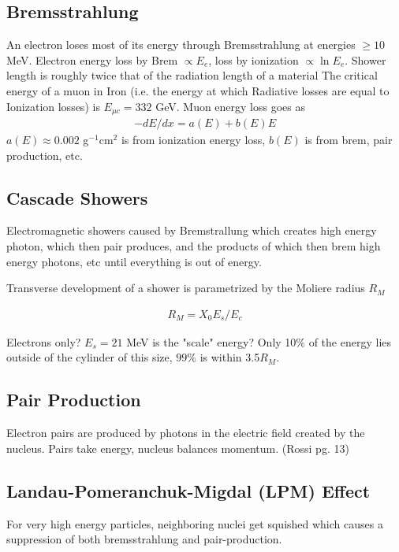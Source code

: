 \subsection{Bremsstrahlung}
 An electron loses most of its energy through Bremsstrahlung at energies $\ge 10$ MeV. Electron energy loss by Brem $\propto E_e$, loss by ionization $\propto \ln E_e$. Shower length is roughly twice that of the radiation length of a material \cite{pdg} The critical energy of a muon in Iron (i.e. the energy at which Radiative losses are equal to Ionization losses) is $E_{\mu c} = 332$ GeV. Muon energy loss goes as 
 \begin{align}
 -dE/dx = a(E) + b(E)E
 \end{align}
 $a(E)\approx 0.002$ g$^{-1}$cm$^2$ is from ionization energy loss, $b(E)$ is from brem, pair production, etc.
\subsection{Cascade Showers}

Electromagnetic showers caused by Bremstrallung which creates high energy photon, which then pair produces, and the products of which then brem high energy photons, etc until everything is out of energy.

Transverse development of a shower is parametrized by the Moliere radius $R_M$


\begin{align}
R_M = X_0E_s/E_c
\end{align}

Electrons only? $E_s = 21$ MeV is the "scale" energy? Only 10$\%$ of the energy lies outside of the cylinder of this size, $99\%$ is within 3.5$R_M$. 

\subsection{Pair Production}
Electron pairs are produced by photons in the electric field created by the nucleus. Pairs take energy, nucleus balances momentum. (Rossi pg. 13)

\subsection{Landau-Pomeranchuk-Migdal (LPM) Effect}
For very high energy particles, neighboring nuclei get squished which causes a suppression of both bremsstrahlung and pair-production.



